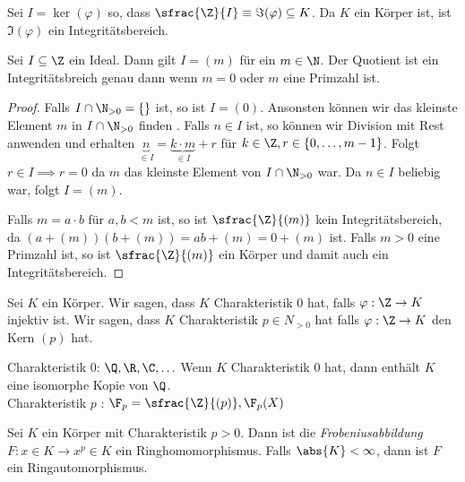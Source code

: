 Sei $I = \ker(\varphi)$ so, dass $\sfrac{\Z}{I} \equiv \Im(\varphi) \subseteq K$.
Da $K$ ein Körper ist, ist $\Im(\varphi)$ ein Integritätsbereich.

\begin{lemma}
	Sei $I \subseteq \Z$ ein Ideal. Dann gilt $I = (m)$ für ein $m \in \N$. 
	Der Quotient ist ein Integritätsbreich genau dann wenn $m = 0$ oder $m$ eine Primzahl ist.
\end{lemma}

\begin{proof}
	Falls $I \cap  \N_{> 0} = \{\} $ ist, so ist $I = (0)$. 
	Ansonsten können wir das kleinste Element $m$ in $I \cap  \N_{> 0}$ finden .
	Falls $n \in I$ ist, so können wir Division mit Rest anwenden und erhalten
	$\underbrace{n}_{\in I} = \underbrace{k \cdot m}_{\in I} + r$ für $k \in \Z, r \in \{0,\ldots,m-1\}$.
	Folgt $r \in I \implies r = 0$ da $m$ das kleinste Element von $I \cap \N_{> 0}$ war.
	Da $n \in I$ beliebig war, folgt $I = (m)$.

	Falls $m = a\cdot b$ für $a,b < m$ ist, so ist $\sfrac{\Z}{(m)}$ kein Integritätsbereich, da $(a+(m))(b+(m)) = ab + (m) = 0 + (m)$  ist.
	Falls $m > 0$ eine Primzahl ist, so ist $\sfrac{\Z}{(m)}$ ein Körper und damit auch ein Integritätsbereich.
\end{proof}

\begin{definition}
	Sei $K$ ein Körper. Wir sagen, dass $K$ Charakteristik $0$ hat, falls $\varphi: \Z \to K$ injektiv ist.
	Wir sagen, dass $K$ Charakteristik $p \in N_{> 0} $ hat falls $\varphi: \Z \to K$ den Kern $(p)$ hat.
\end{definition}

\begin{eg}
	Charakteristik $ 0$: $\Q,\R,\C,\ldots$ 
	Wenn $K$ Charakteristik $0$ hat, dann enthält $K$ eine isomorphe Kopie von $\Q$.\\
	Charakteristik $p$ : $\F_{p} = \sfrac{\Z}{(p)}, \F_{p}(X)$
\end{eg}

\begin{proposition}
	Sei $K$ ein Körper mit Charakteristik $p > 0$.
	Dann ist die \emph{Frobeniusabbildung} $F: x \in K \to x^{p} \in K$ ein Ringhomomorphismus.
	Falls $\abs{K} < \infty$, dann ist $F$ ein Ringautomorphismus.
\end{proposition}

